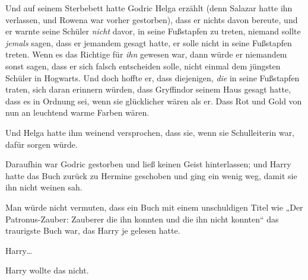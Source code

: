 Und auf seinem Sterbebett hatte Godric Helga erzählt (denn Salazar hatte ihn verlassen, und Rowena war vorher gestorben), dass er nichts davon bereute, und er warnte seine Schüler \emph{nicht} davor, in seine Fußstapfen zu treten, niemand sollte \emph{jemals} sagen, dass er jemandem gesagt hatte, er solle nicht in seine Fußstapfen treten. Wenn es das Richtige für \emph{ihn} gewesen war, dann würde er niemandem sonst sagen, dass er sich falsch entscheiden solle, nicht einmal dem jüngsten Schüler in Hogwarts. Und doch hoffte er, dass diejenigen, \emph{die} in seine Fußstapfen traten, sich daran erinnern würden, dass Gryffindor seinem Haus gesagt hatte, dass es in Ordnung sei, wenn sie glücklicher wären als er. Dass Rot und Gold von nun an leuchtend warme Farben wären.

Und Helga hatte ihm weinend versprochen, dass sie, wenn sie Schulleiterin war, dafür sorgen würde.

Daraufhin war Godric gestorben und ließ keinen Geist hinterlassen; und Harry hatte das Buch zurück zu Hermine geschoben und ging ein wenig weg, damit sie ihn nicht weinen sah.

Man würde nicht vermuten, dass ein Buch mit einem unschuldigen Titel wie „Der Patronus-Zauber: Zauberer die ihn konnten und die ihn nicht konnten“ das traurigste Buch war, das Harry je gelesen hatte.

Harry…

Harry wollte das nicht.

